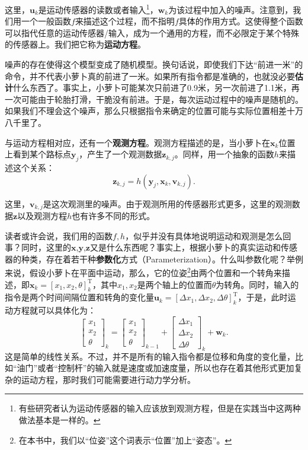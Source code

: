 这里，$\bm{u}_k$是运动传感器的读数或者输入\footnote{有些研究者认为运动传感器的输入应该放到观测方程，但是在实践当中这两种做法基本是一样的。}，$\bm{w}_k$为该过程中加入的噪声。注意到，我们用一个一般函数$f$来描述这个过程，而不指明$f$具体的作用方式。这使得整个函数可以指代任意的运动传感器/输入，成为一个通用的方程，而不必限定于某个特殊的传感器上。我们把它称为\textbf{运动方程}。

噪声的存在使得这个模型变成了随机模型。换句话说，即使我们下达“前进一米”的命令，并不代表小萝卜真的前进了一米。如果所有指令都是准确的，也就没必要\textbf{估计}什么东西了。事实上，小萝卜可能某次只前进了0.9米，另一次前进了1.1米，再一次可能由于轮胎打滑，干脆没有前进。于是，每次运动过程中的噪声是随机的。如果我们不理会这个噪声，那么只根据指令来确定的位置可能与实际位置相差十万八千里了。

与运动方程相对应，还有一个\textbf{观测方程}。观测方程描述的是，当小萝卜在$\bm{x}_k$位置上看到某个路标点$\bm{y}_j$，产生了一个观测数据$\bm{z}_{k,j}$。同样，用一个抽象的函数$h$来描述这个关系：
\begin{equation}
{\bm{z}_{k,j}} = h\left( {{\bm{y}_j},{\bm{x}_k}, \bm{v}_{k,j} } \right).
\end{equation}

这里，$\bm{v}_{k,j}$是这次观测里的噪声。由于观测所用的传感器形式更多，这里的观测数据$\bm{z}$以及观测方程$h$也有许多不同的形式。

读者或许会说，我们用的函数$f,h$，似乎并没有具体地说明运动和观测是怎么回事？同时，这里的$\bm{x}$,$\bm{y}$,$\bm{z}$又是什么东西呢？事实上，根据小萝卜的真实运动和传感器的种类，存在着若干种\textbf{参数化}方式（Parameterization）。什么叫参数化呢？举例来说，假设小萝卜在平面中运动，那么，它的位姿\footnote{在本书中，我们以“位姿”这个词表示“位置”加上“姿态”。}由两个位置和一个转角来描述，即$\bm{x}_k = [x_1,x_2,\theta]_k^\mathrm{T}$，其中$x_1,x_2$是两个轴上的位置而$\theta$为转角。同时，输入的指令是两个时间间隔位置和转角的变化量$\bm{u}_k = [ \Delta x_1, \Delta x_2, \Delta \theta ]_k^\mathrm{T} $，于是，此时运动方程就可以具体化为：
\begin{equation}
{\left[ \begin{array}{l}
	x_1\\
	x_2\\
	\theta
	\end{array} \right]_k} = {\left[ \begin{array}{l}
	x_1\\
	x_2\\
	\theta
	\end{array} \right]_{k - 1}} + {\left[ \begin{array}{l}
	\Delta x_1\\
	\Delta x_2\\
	\Delta \theta
	\end{array} \right]_k} + {\bm{w}_k}.
\end{equation}
这是简单的线性关系。不过，并不是所有的输入指令都是位移和角度的变化量，比如“油门”或者“控制杆”的输入就是速度或加速度量，所以也存在着其他形式更加复杂的运动方程，那时我们可能需要进行动力学分析。

